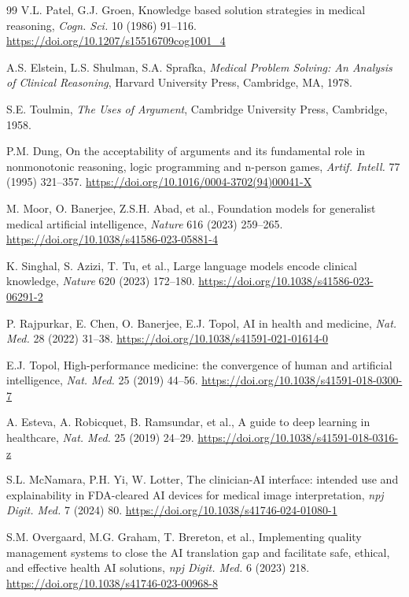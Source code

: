 \documentclass[11pt,a4paper]{article}
\begin{document}
\begin{thebibliography}{99}
V.L. Patel, G.J. Groen, Knowledge based solution strategies in medical reasoning, \emph{Cogn. Sci.} 10 (1986) 91--116. \url{https://doi.org/10.1207/s15516709cog1001_4}

A.S. Elstein, L.S. Shulman, S.A. Sprafka, \emph{Medical Problem Solving: An Analysis of Clinical Reasoning}, Harvard University Press, Cambridge, MA, 1978.

S.E. Toulmin, \emph{The Uses of Argument}, Cambridge University Press, Cambridge, 1958.

P.M. Dung, On the acceptability of arguments and its fundamental role in nonmonotonic reasoning, logic programming and n-person games, \emph{Artif. Intell.} 77 (1995) 321--357. \url{https://doi.org/10.1016/0004-3702(94)00041-X}

M. Moor, O. Banerjee, Z.S.H. Abad, et al., Foundation models for generalist medical artificial intelligence, \emph{Nature} 616 (2023) 259--265. \url{https://doi.org/10.1038/s41586-023-05881-4}

K. Singhal, S. Azizi, T. Tu, et al., Large language models encode clinical knowledge, \emph{Nature} 620 (2023) 172--180. \url{https://doi.org/10.1038/s41586-023-06291-2}

P. Rajpurkar, E. Chen, O. Banerjee, E.J. Topol, AI in health and medicine, \emph{Nat. Med.} 28 (2022) 31--38. \url{https://doi.org/10.1038/s41591-021-01614-0}

E.J. Topol, High-performance medicine: the convergence of human and artificial intelligence, \emph{Nat. Med.} 25 (2019) 44--56. \url{https://doi.org/10.1038/s41591-018-0300-7}

A. Esteva, A. Robicquet, B. Ramsundar, et al., A guide to deep learning in healthcare, \emph{Nat. Med.} 25 (2019) 24--29. \url{https://doi.org/10.1038/s41591-018-0316-z}

S.L. McNamara, P.H. Yi, W. Lotter, The clinician-AI interface: intended use and explainability in FDA-cleared AI devices for medical image interpretation, \emph{npj Digit. Med.} 7 (2024) 80. \url{https://doi.org/10.1038/s41746-024-01080-1}

S.M. Overgaard, M.G. Graham, T. Brereton, et al., Implementing quality management systems to close the AI translation gap and facilitate safe, ethical, and effective health AI solutions, \emph{npj Digit. Med.} 6 (2023) 218. \url{https://doi.org/10.1038/s41746-023-00968-8}


\end{thebibliography}
\end{document}
